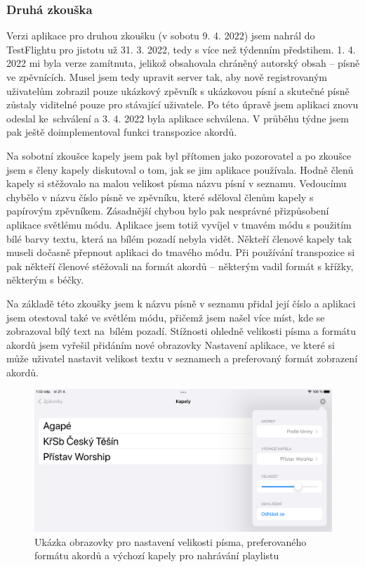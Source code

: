 \subsubsection{Druhá zkouška}

Verzi aplikace pro druhou zkoušku (v sobotu 9. 4. 2022) jsem nahrál do TestFlightu pro jistotu už 31. 3. 2022, tedy s více než týdenním předstihem. 1. 4. 2022 mi byla verze zamítnuta, jelikož obsahovala chráněný autorský obsah -- písně ve zpěvnících. Musel jsem tedy upravit server tak, aby nově registrovaným uživatelům zobrazil pouze ukázkový zpěvník s ukázkovou písní a skutečné písně zůstaly viditelné pouze pro stávající uživatele. Po této úpravě jsem aplikaci znovu odeslal ke~schválení a 3. 4. 2022 byla aplikace schválena. V průběhu týdne jsem pak ještě doimplementoval funkci transpozice akordů.

Na sobotní zkoušce kapely jsem pak byl přítomen jako pozorovatel a po zkoušce jsem s členy kapely diskutoval o tom, jak se jim aplikace používala. Hodně členů kapely si stěžovalo na malou velikost písma názvu písní v seznamu. Vedoucímu chybělo v názvu číslo písně ve zpěvníku, které sděloval členům kapely s papírovým zpěvníkem. Zásadnější chybou bylo pak nesprávné přizpůsobení aplikace světlému módu. Aplikace jsem totiž vyvíjel v tmavém módu s použitím bílé barvy textu, která na bílém pozadí nebyla vidět. Někteří členové kapely tak museli dočasně přepnout aplikaci do tmavého módu. Při používání transpozice si pak někteří členové stěžovali na formát akordů -- některým vadil formát s křížky, některým s béčky.

Na základě této zkoušky jsem k názvu písně v seznamu přidal její číslo a aplikaci jsem otestoval také ve světlém módu, přičemž jsem našel více míst, kde se zobrazoval bílý text na~bílém pozadí. Stížnosti ohledně velikosti písma a formátu akordů jsem vyřešil přidáním nové obrazovky Nastavení aplikace, ve které si může uživatel nastavit velikost textu v seznamech a preferovaný formát zobrazení akordů.

\begin{figure}
    \includegraphics[width=\textwidth]{images/6-testovani/6-6-nastaveni-ipad.png}
    \caption[Ukázka obrazovky Nastavení aplikace na iOS]{Ukázka obrazovky pro nastavení velikosti písma, preferovaného formátu akordů a výchozí kapely pro nahrávání playlistu}
\end{figure}

